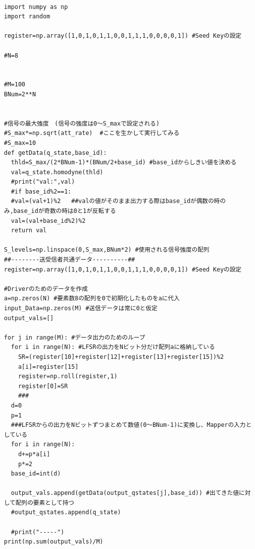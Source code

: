 \begin{lstlisting}[caption=受信側のプログラム（最大強度の調整なし）,label=program3]

import numpy as np
import random

register=np.array([1,0,1,0,1,1,0,0,1,1,1,0,0,0,0,1]) #Seed Keyの設定

#N=8 


#M=100 
BNum=2**N 


#信号の最大強度　(信号の強度は0～S_maxで設定される)
#S_max*=np.sqrt(att_rate)  #ここを生かして実行してみる
#S_max=10
def getData(q_state,base_id):
  thld=S_max/(2*BNum-1)*(BNum/2+base_id) #base_idからしきい値を決める
  val=q_state.homodyne(thld)
  #print("val:",val)
  #if base_id%2==1:
  #val=(val+1)%2   ##valの値がそのまま出力する際はbase_idが偶数の時のみ,base_idが奇数の時は0と1が反転する
  val=(val+base_id%2)%2
  return val

S_levels=np.linspace(0,S_max,BNum*2) #使用される信号強度の配列
##--------送受信者共通データ----------##
register=np.array([1,0,1,0,1,1,0,0,1,1,1,0,0,0,0,1]) #Seed Keyの設定

#Driverのためのデータを作成
a=np.zeros(N) #要素数8の配列を0で初期化したものをaに代入
input_Data=np.zeros(M) #送信データは常に0と仮定
output_vals=[]

for j in range(M): #データ出力のためのループ
  for i in range(N): #LFSRの出力をNビット分だけ配列aに格納している
    SR=(register[10]+register[12]+register[13]+register[15])%2 
    a[i]=register[15] 
    register=np.roll(register,1) 
    register[0]=SR
    ###
  d=0
  p=1
  ###LFSRからの出力をNビットずつまとめて数値(0～BNum-1)に変換し、Mapperの入力としている
  for i in range(N):
    d+=p*a[i]
    p*=2 
  base_id=int(d)

  output_vals.append(getData(output_qstates[j],base_id)) #出てきた値に対して配列の要素として持つ
  #output_qstates.append(q_state)
  
  #print("-----")
print(np.sum(output_vals)/M)

\end{lstlisting}

